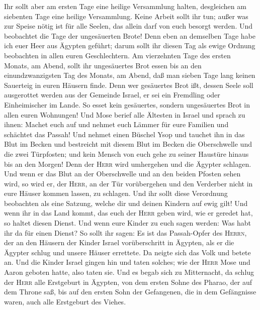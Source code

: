  Ihr sollt aber am ersten Tage eine heilige Versammlung
halten, desgleichen am siebenten Tage eine heilige Versammlung. Keine
Arbeit sollt ihr tun; außer was zur Speise nötig ist für alle Seelen,
das allein darf von euch besorgt werden.  Und beobachtet
die Tage der ungesäuerten Brote! Denn eben an demselben Tage habe ich
euer Heer aus Ägypten geführt; darum sollt ihr diesen Tag als ewige
Ordnung beobachten in allen euren Geschlechtern.  Am
vierzehnten Tage des ersten Monats, am Abend, sollt ihr ungesäuertes
Brot essen bis an den einundzwanzigsten Tag des Monats, am Abend,
 daß man sieben Tage lang keinen Sauerteig in euren
Häusern finde. Denn wer gesäuertes Brot ißt, dessen Seele soll
ausgerottet werden aus der Gemeinde Israel, er sei ein Fremdling oder
Einheimischer im Lande.  So esset kein gesäuertes,
sondern ungesäuertes Brot in allen euren Wohnungen!  Und
Mose berief alle Ältesten in Israel und sprach zu ihnen: Machet euch auf
und nehmet euch Lämmer für eure Familien und schächtet das Passah!
 Und nehmet einen Büschel Ysop und tauchet ihn in das
Blut im Becken und bestreicht mit diesem Blut im Becken die Oberschwelle
und die zwei Türpfosten; und kein Mensch von euch gehe zu seiner
Haustüre hinaus bis an den Morgen!  Denn der
\textsc{Herr} wird umhergehen und die Ägypter schlagen. Und wenn er das
Blut an der Oberschwelle und an den beiden Pfosten sehen wird, so wird
er, der \textsc{Herr}, an der Tür vorübergehen und den Verderber nicht
in eure Häuser kommen lassen, zu schlagen.  Und ihr sollt
diese Verordnung beobachten als eine Satzung, welche dir und deinen
Kindern auf ewig gilt!  Und wenn ihr in das Land kommt,
das euch der \textsc{Herr} geben wird, wie er geredet hat, so haltet
diesen Dienst.  Und wenn eure Kinder zu euch sagen
werden: Was habt ihr da für einen Dienst?  So sollt ihr
sagen: Es ist das Passah-Opfer des \textsc{Herrn}, der an den Häusern
der Kinder Israel vorüberschritt in Ägypten, als er die Ägypter schlug
und unsere Häuser errettete.  Da neigte sich das Volk und
betete an. Und die Kinder Israel gingen hin und taten solches; wie der
\textsc{Herr} Mose und Aaron geboten hatte, also taten sie.
 Und es begab sich zu Mitternacht, da schlug der
\textsc{Herr} alle Erstgeburt in Ägypten, von dem ersten Sohne des
Pharao, der auf dem Throne saß, bis auf den ersten Sohn der Gefangenen,
die in dem Gefängnisse waren, auch alle Erstgeburt des Viehes.

